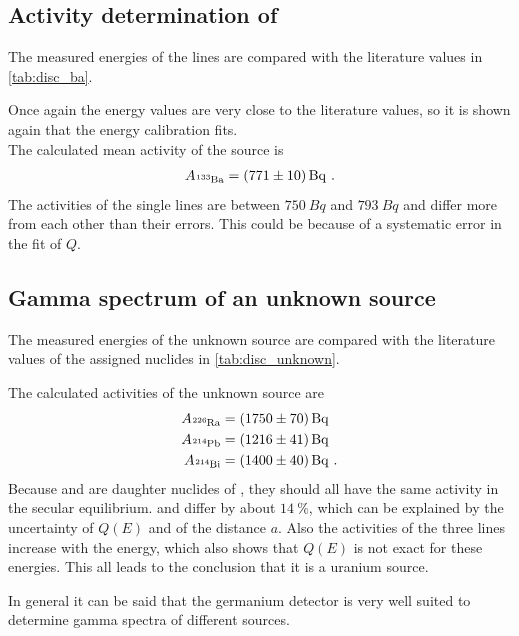 \subsection{Activity determination of \texorpdfstring{}{133Ba}}

The measured energies of the  lines are compared with the literature values in \autoref{tab:disc_ba}.




Once again the energy values are very close to the literature values, so it is shown again that the energy calibration fits.
\\
The calculated mean activity of the  source is
\begin{align}
    A_{\ce{^{133}Ba}} = \SI{771 \pm 10}{Bq} \ .
\end{align}
The activities of the single lines are between $\SI{750}{Bq}$ and $\SI{793}{Bq}$ and differ more from each other than their errors.
This could be because of a systematic error in the fit of $Q$.

\subsection{Gamma spectrum of an unknown source}

The measured energies of the unknown source are compared with the literature values of the assigned nuclides in \autoref{tab:disc_unknown}.



The calculated activities of the unknown source are
\begin{align}
    A_{\ce{^{226}Ra}} &= \SI{1750 \pm 70}{Bq} \\
    A_{\ce{^{214}Pb}} &= \SI{1216 \pm 41}{Bq} \\
    A_{\ce{^{214}Bi}} &= \SI{1400 \pm 40}{Bq} \ .
\end{align}
Because  and  are daughter nuclides of , they should all have the same activity in the secular equilibrium.
 and  differ by about $\SI{14}{\percent}$, which can be explained by the uncertainty of $Q(E)$ and of the distance $a$.
Also the activities of the three  lines increase with the energy, which also shows that $Q(E)$ is not exact for these energies.
This all leads to the conclusion that it is a uranium source.

In general it can be said that the germanium detector is very well suited to determine gamma spectra of different sources.

\clearpage
